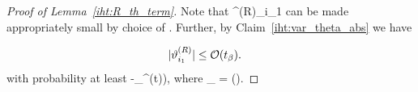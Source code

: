 \documentclass{article}
\newcommand{\siri}[1]{{\color{black}{#1}}}
\def\[#1\]{{$#1$}}
\begin{document}
\begin{proof}[Proof of Lemma~\ref{iht:R_th_term}]
	
	
	
	
	
	
	
	
	
	
	
	
	
	
	
	
	
	
	
	
	
	
	











	
	
	
	
	
	
	
	Note that \[\gamma^{(R)}_{i_1}\] can be made appropriately small by choice of \[R\]. Further, by Claim~\ref{iht:var_theta_abs} we have
	






   	\begin{align*}
   	|\vartheta^{(R)}_{i_1}| 
   	& \leq  \siri{\mathcal{O}(t_{\beta})}.
   	\end{align*}
	with probability at least \[(1-\delta_{\beta}^{(t)})\], where \[t_{\beta} = ()\]. 





	
	



\end{proof}
\end{document}
